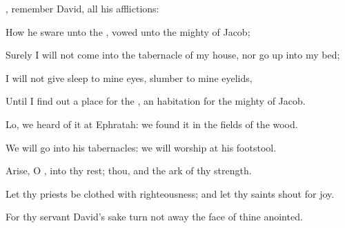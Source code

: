 {\Q {},
remember
David,
{} all his
afflictions:


\par }{\Q {}How he
sware unto the
{},
{}
vowed unto the
mighty
{} of
Jacob;


\par }{\Q {}Surely I will not
come into the
tabernacle of my
house, nor go
up into my
bed;


\par }{\Q {}I will not
give
sleep to mine
eyes,
{}
slumber to mine
eyelids,


\par }{\Q {}Until I find
out a
place for the
{}, an
habitation for the
mighty
{} of
Jacob.


\par }{\Q {}Lo, we
heard of it at
Ephratah: we
found it in the
fields of the
wood.


\par }{\Q {}We will
go into his
tabernacles: we will
worship at his
footstool.


\par }{\Q {}Arise, O
{}, into thy
rest; thou, and the
ark of thy
strength.


\par }{\Q {}Let thy
priests be
clothed with
righteousness; and let thy
saints shout for
joy.


\par }{\Q {}For thy
servant
David’s sake turn not
away the
face of thine
anointed.


\par }{\BB \par }
